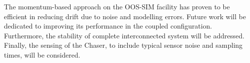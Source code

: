 
The momentum-based approach on the OOS-SIM facility has proven to be efficient in reducing drift due to noise and modelling errors. Future work will be dedicated to improving its performance in the coupled configuration. Furthermore, the stability of complete interconnected system will be addressed. Finally, the sensing of the Chaser, to include typical sensor noise and sampling times, will be considered.
%
%
%
%
%
%
